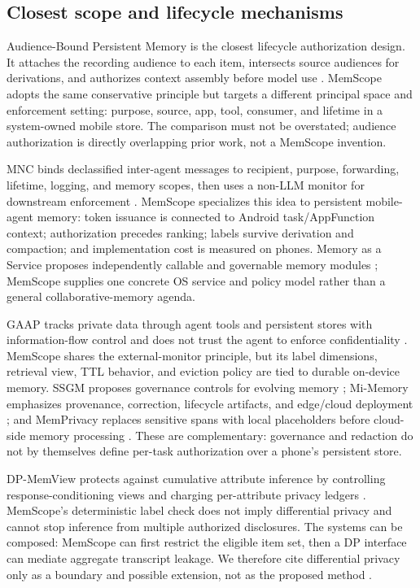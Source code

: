\subsection{Closest scope and lifecycle mechanisms}

Audience-Bound Persistent Memory is the closest lifecycle authorization design. It attaches the recording audience to each item, intersects source audiences for derivations, and authorizes context assembly before model use \citep{liu2026audience}. MemScope adopts the same conservative principle but targets a different principal space and enforcement setting: purpose, source, app, tool, consumer, and lifetime in a system-owned mobile store. The comparison must not be overstated; audience authorization is directly overlapping prior work, not a MemScope invention.

MNC binds declassified inter-agent messages to recipient, purpose, forwarding, lifetime, logging, and memory scopes, then uses a non-LLM monitor for downstream enforcement \citep{xu2026mnc}. MemScope specializes this idea to persistent mobile-agent memory: token issuance is connected to Android task/AppFunction context; authorization precedes ranking; labels survive derivation and compaction; and implementation cost is measured on phones. Memory as a Service proposes independently callable and governable memory modules \citep{li2025maas}; MemScope supplies one concrete OS service and policy model rather than a general collaborative-memory agenda.

GAAP tracks private data through agent tools and persistent stores with information-flow control and does not trust the agent to enforce confidentiality \citep{stanley2026gaap}. MemScope shares the external-monitor principle, but its label dimensions, retrieval view, TTL behavior, and eviction policy are tied to durable on-device memory. SSGM proposes governance controls for evolving memory \citep{lam2026ssgm}; Mi-Memory emphasizes provenance, correction, lifecycle artifacts, and edge/cloud deployment \citep{liu2026mimemory}; and MemPrivacy replaces sensitive spans with local placeholders before cloud-side memory processing \citep{chen2026memprivacy}. These are complementary: governance and redaction do not by themselves define per-task authorization over a phone's persistent store.

DP-MemView protects against cumulative attribute inference by controlling response-conditioning views and charging per-attribute privacy ledgers \citep{kim2026dpmemview}. MemScope's deterministic label check does not imply differential privacy and cannot stop inference from multiple authorized disclosures. The systems can be composed: MemScope can first restrict the eligible item set, then a DP interface can mediate aggregate transcript leakage. We therefore cite differential privacy only as a boundary and possible extension, not as the proposed method \citep{dwork2014algorithmic}.

